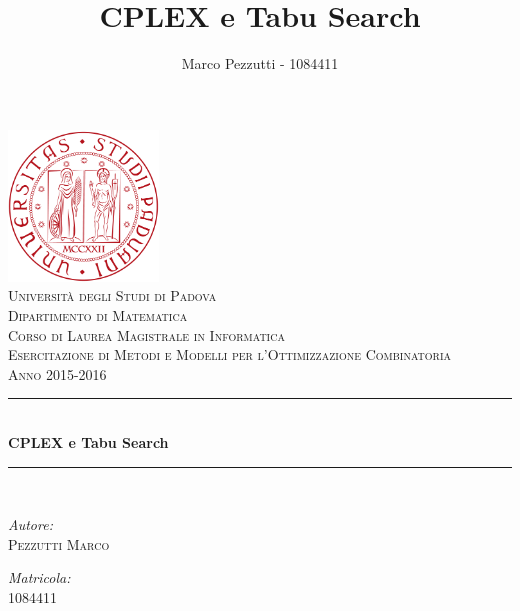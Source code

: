 \documentclass[10pt,a4paper,final]{article}
\author{Marco Pezzutti - 1084411}
\title{CPLEX e Tabu Search}
\date{}
\begin{document}
\begin{titlepage}
\begin{center}
\includegraphics[width=40mm]{immagini/Logo_Padova.png}\\[1cm]
\textcolor{redUni}{\textsc{\LARGE Università degli Studi di Padova}}\\[0.5cm]
\textcolor{redUni}{\textsc{\Large Dipartimento di Matematica}}\\[0.5cm]
\textcolor{redUni}{\textsc{\Large Corso di Laurea Magistrale in Informatica}}\\[2cm]
\textsc{\Large Esercitazione di Metodi e Modelli per l'Ottimizzazione Combinatoria}\\[0.5cm]
\textsc{\large Anno 2015-2016} \\[1cm]
\rule{\linewidth}{0.3mm}\\[0.5cm]
{\huge \bfseries CPLEX e Tabu Search}\\[0.3cm]
\rule{\linewidth}{0.3mm}\\[1cm]
\begin{minipage}{0.4\textwidth}
	\begin{flushleft}
	\emph{Autore:}\\
	\textsc{\large Pezzutti Marco}\\
	\end{flushleft}
\end{minipage}
\begin{minipage}{0.4\textwidth}
	\begin{flushright}
	\emph{Matricola:}\\
	\textsc{\large 1084411}\\
	\end{flushright}
\end{minipage}
\end{center}
\end{titlepage}

\tableofcontents
\listoffigures
\listoftables
\newpage

%






\appendix

\end{document}
